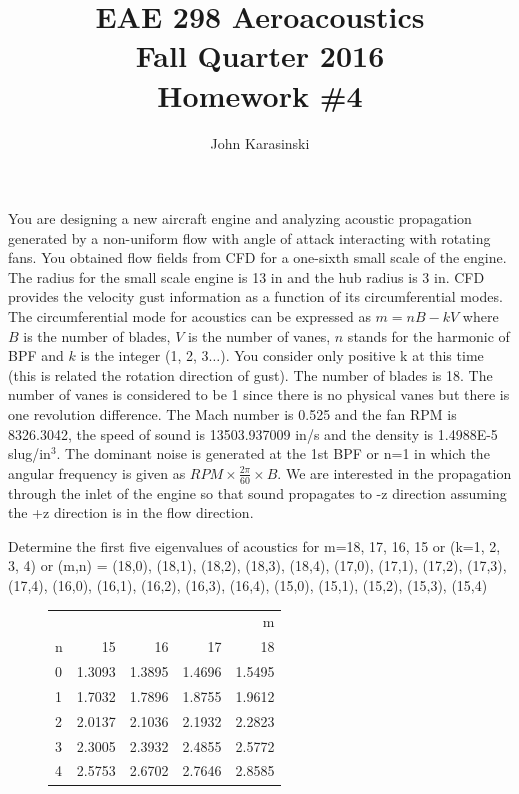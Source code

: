 \documentclass[onecolumn,10pt]{jhwhw}
\author{John Karasinski}
\title{EAE 298 Aeroacoustics \\ Fall Quarter 2016 \\ Homework \#4}
\begin{document}
\maketitle

You are designing a new aircraft engine and analyzing acoustic propagation generated by a non-uniform flow with angle of attack interacting with rotating fans. You obtained flow fields from CFD for a one-sixth small scale of the engine. The radius for the small scale engine is 13 in and the hub radius is 3 in. CFD provides the velocity gust information as a function of its circumferential modes. The circumferential mode for acoustics can be expressed as $m= nB - kV$ where $B$ is the number of blades, $V$ is the number of vanes, $n$ stands for the harmonic of BPF and $k$ is the integer (1, 2, 3$\ldots$). You consider only positive k at this time (this is related the rotation direction of gust). The number of blades is 18. The number of vanes is considered to be 1 since there is no physical vanes but there is one revolution difference. The Mach number is 0.525 and the fan RPM is 8326.3042, the speed of sound is 13503.937009 in/s and the density is 1.4988E-5 slug/in$^3$. The dominant noise is generated at the 1st BPF or n=1 in which the angular frequency is given as $RPM \times \frac{2 \pi}{60} \times B$. We are interested in the propagation through the inlet of the engine so that sound propagates to -z direction assuming the +z direction is in the flow direction.

\problem{[20 points]}
Determine the first five eigenvalues of acoustics for m=18, 17, 16, 15 or (k=1, 2, 3, 4) or (m,n) = (18,0), (18,1), (18,2), (18,3), (18,4), (17,0), (17,1), (17,2), (17,3), (17,4), (16,0), (16,1), (16,2), (16,3), (16,4), (15,0), (15,1), (15,2), (15,3), (15,4)

\begin{figure}[h]
  \centering
\begin{tabular}{l | rrrr}
\toprule
  &         &         &         &       m \\
n &      15 &      16 &      17 &      18 \\
\midrule
0 &  1.3093 &  1.3895 &  1.4696 &  1.5495 \\
1 &  1.7032 &  1.7896 &  1.8755 &  1.9612 \\
2 &  2.0137 &  2.1036 &  2.1932 &  2.2823 \\
3 &  2.3005 &  2.3932 &  2.4855 &  2.5772 \\
4 &  2.5753 &  2.6702 &  2.7646 &  2.8585 \\
\bottomrule
\end{tabular}
\end{figure}
\end{document}

